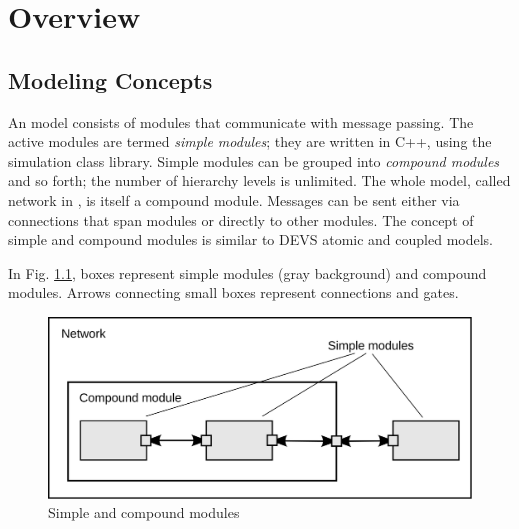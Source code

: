 \chapter{Overview}
\label{cha:overview}


\section{Modeling Concepts}

An {\opp} model consists of modules that communicate with message passing.
The active modules are termed \textit{simple modules}; they are written in C++,
using the simulation class library. Simple modules can be grouped into
\textit{compound modules} and so forth; the number of hierarchy levels is
unlimited. The whole model, called network in {\opp}, is itself a compound module.
Messages can be sent either via connections that span
modules or directly to other modules. The concept of simple and
compound modules is similar to DEVS atomic and coupled models.

In Fig. \ref{fig:ch-overview:modules}, boxes represent simple modules
(gray background) and compound modules.
Arrows connecting small boxes represent connections and gates.

\begin{figure}[htbp]
\centering
\includegraphics[scale=0.6]{figures/over-modules}
\caption{Simple and compound modules}
\label{fig:ch-overview:modules}
\end{figure}


